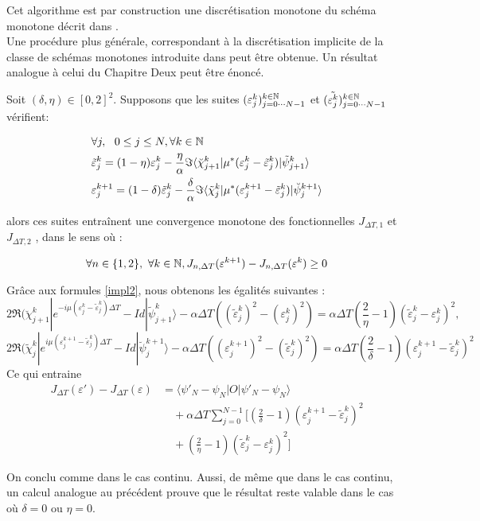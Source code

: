 Cet algorithme est par construction une discrétisation monotone du schéma monotone décrit dans \cite{Zhu}.\\

Une procédure plus générale, correspondant à la discrétisation implicite de la classe de schémas monotones introduite dans \cite{Maday} peut être obtenue. Un résultat analogue à celui du Chapitre Deux peut être énoncé.
\begin{theorem} \label{theoimpl}
	
	Soit $(\delta,\eta) \in [0,2]^2$. Supposons que les suites 
	$(\varepsilon_j^k)^{k\in\mathbb N}_{j = 0\cdots N-1}$ et $(\tilde{\varepsilon_j^k})^{k\in\mathbb N}_{j = 0\cdots N-1}$ vérifient:
	
	\begin{align} \label{impl2}
	&\forall j, \ \ 0\leq j\leq N, \forall k \in \mathbb N \\ \nonumber
	&\tilde{\varepsilon}^k_j = (1-\eta)\varepsilon^k_j - \frac{\eta}{\alpha} \Im \langle  \breve{\chi}^k_{j+1}|\mu^*(\varepsilon^k_j-\tilde{\varepsilon}^k_j)|\tilde{\psi}^k_{j+1} \rangle\\
	&\varepsilon^{k+1}_j = (1-\delta)\tilde{\varepsilon}^k_j - \frac{\delta}{\alpha} \Im \langle  \tilde{\chi}^k_{j}|\mu^*(\varepsilon^{k+1}_j-\tilde{\varepsilon}^k_j)|\breve{\psi}^{k+1}_{j} \rangle \nonumber
	\end{align}
	
	alors ces suites entraînent une convergence monotone des fonctionnelles $J_{\Delta T,1}$ et $J_{\Delta T,2}$ , dans le sens où :
	
	$$ \forall n \in \{1,2\},\  \forall k \in \mathbb N, J_{n,\Delta T}(\varepsilon^{k+1}) - J_{n,\Delta T}(\varepsilon^k)\geq 0 $$
	
\end{theorem}

\begin{ proof }
Grâce aux formules \eqref{impl2}, nous obtenons les égalités suivantes :
$$
2\Re(\breve{\chi}^k_{j+1}|e^{-i\mu(\varepsilon^k_j-\tilde{\varepsilon}^k_j)\Delta T}-Id|\tilde{\psi}^k_{j+1}\rangle - \alpha \Delta T ((\tilde{\varepsilon}^k_j)^2-(\varepsilon^k_j)^2) = \alpha \Delta T (\frac{2}{\eta}-1)(\tilde{\varepsilon}_j^k - \varepsilon^k_j)^2,
$$
$$ 2\Re(\tilde{\chi}^k_j|e^{i\mu(\varepsilon^{k+1}_j-\tilde{\varepsilon}^k_j)\Delta T}-Id|\breve{\psi}^{k+1}_j\rangle - \alpha \Delta T ((\varepsilon^{k+1}_j)^2-(\tilde{\varepsilon}^k_j)^2)=\alpha \Delta T (\frac{2}{\delta}-1)(\varepsilon^{k+1}_j-\tilde{\varepsilon}^k_j)^2
$$
Ce qui entraine
\begin{align*}
J_{\Delta T}(\varepsilon')-J_{\Delta T}(\varepsilon) &= \langle \psi'_N-\psi_N |O|\psi'_N-\psi_N \rangle \\
&\quad +\alpha \Delta T \sum_{j=0}^{N -1}[(\frac{2}{\delta}-1)(\varepsilon^{k+1}_j-\tilde{\varepsilon}^k_j)^2\\
&\quad + (\frac{2}{\eta}-1)(\tilde{\varepsilon}_j^k - \varepsilon^k_j)^2]
\end{align*}
	
On conclu comme dans le cas continu. Aussi, de même que dans le cas continu, un calcul analogue au précédent prouve que le résultat reste valable dans le cas où $ \delta = 0$ ou $\eta = 0$.
\end{ proof }

